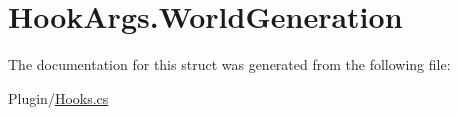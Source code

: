 \hypertarget{structOTA_1_1Plugin_1_1HookArgs_1_1WorldGeneration}{}\section{Hook\+Args.\+World\+Generation}
\label{structOTA_1_1Plugin_1_1HookArgs_1_1WorldGeneration}


The documentation for this struct was generated from the following file\+:\begin{DoxyCompactItemize}
\item 
Plugin/\hyperlink{Hooks_8cs}{Hooks.\+cs}\end{DoxyCompactItemize}

